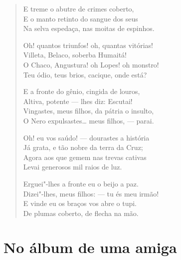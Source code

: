 \begin{verse}
E treme o abutre de crimes coberto,\\
E o manto retinto do sangue dos seus\\
Na selva espedaça, nas moitas de espinhos.

Oh! quantos triunfos! oh, quantas vitórias!\\
Villeta, Belaco, soberba Humaitá!\\
O Chaco, Angustura! oh Lopes! oh monstro!\\
Teu ódio, teus brios, cacique, onde está?

E a fronte do gênio, cingida de louros,\\
Altiva, potente --- lhes diz: Escutai!\\
Vingastes, meus filhos, da pátria o insulto,\\
O Nero expulsastes\ldots{} meus filhos, --- parai.

Oh! eu vos saúdo! --- dourastes a história\\
Já grata, e tão nobre da terra da Cruz;\\
Agora aos que gemem nas trevas cativas\\
Levai generosos mil raios de luz.

Erguei"-lhes a fronte eu o beijo a paz.\\
Dizei"-lhes, meus filhos: --- tu és meu irmão!\\
E vinde eu os braços vos abre o tupi.\\
De plumas coberto, de flecha na mão.
\end{verse}

\chapter{No álbum de uma amiga}

